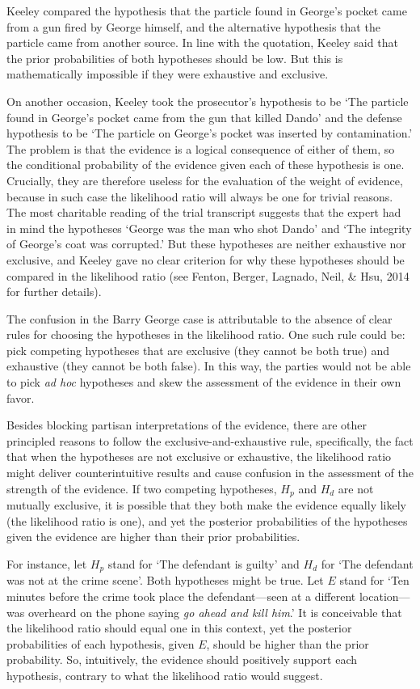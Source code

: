 \documentclass[
  10pt,
  dvipsnames,enabledeprecatedfontcommands]{scrartcl}
\begin{document}
\noindent  Keeley compared the hypothesis that the particle found in
George's pocket came from a gun fired by George himself, and the
alternative hypothesis that the particle came from another source. In
line with the quotation, Keeley said that the prior probabilities of
both hypotheses should be low. But this is mathematically impossible if
they were exhaustive and exclusive.

On another occasion, Keeley took the prosecutor's hypothesis to be `The
particle found in George's pocket came from the gun that killed Dando'
and the defense hypothesis to be `The particle on George's pocket was
inserted by contamination.' The problem is that the evidence is a
logical consequence of either of them, so the conditional probability of
the evidence given each of these hypothesis is one. Crucially, they are
therefore useless for the evaluation of the weight of evidence, because
in such case the likelihood ratio will always be one for trivial
reasons. The most charitable reading of the trial transcript suggests
that the expert had in mind the hypotheses `George was the man who shot
Dando' and `The integrity of George's coat was corrupted.' But these
hypotheses are neither exhaustive nor exclusive, and Keeley gave no
clear criterion for why these hypotheses should be compared in the
likelihood ratio (see Fenton, Berger, Lagnado, Neil, \& Hsu, 2014 for
further details).

The confusion in the Barry George case is attributable to the absence of
clear rules for choosing the hypotheses in the likelihood ratio. One
such rule could be: pick competing hypotheses that are exclusive (they
cannot be both true) and exhaustive (they cannot be both false). In this
way, the parties would not be able to pick \textit{ad hoc} hypotheses
and skew the assessment of the evidence in their own favor.

Besides blocking partisan interpretations of the evidence, there are
other principled reasons to follow the exclusive-and-exhaustive rule,
specifically, the fact that when the hypotheses are not exclusive or
exhaustive, the likelihood ratio might deliver counterintuitive results
and cause confusion in the assessment of the strength of the evidence.
If two competing hypotheses, \(H_p\) and \(H_d\) are not mutually
exclusive, it is possible that they both make the evidence equally
likely (the likelihood ratio is one), and yet the posterior
probabilities of the hypotheses given the evidence are higher than their
prior probabilities.

For instance, let \(H_p\) stand for `The defendant is guilty' and
\(H_d\) for `The defendant was not at the crime scene'. Both hypotheses
might be true. Let \(E\) stand for `Ten minutes before the crime took
place the defendant---seen at a different location--- was overheard on
the phone saying \emph{go ahead and kill him}.' It is conceivable that
the likelihood ratio should equal one in this context, yet the posterior
probabilities of each hypothesis, given \(E\), should be higher than the
prior probability. So, intuitively, the evidence should positively
support each hypothesis, contrary to what the likelihood ratio would
suggest.
\end{document}
